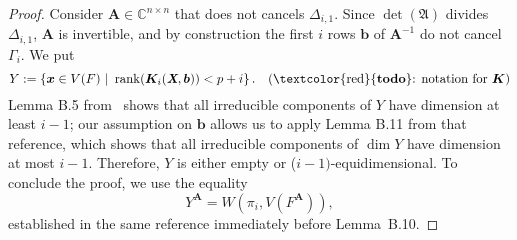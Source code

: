 \documentclass[12pt]{article}
\def\A{\mathfrak{A}}
\def\Xb{\textit{\textbf{X}}}
\def\mA{{\bm A}}
\def\xb{{\bm x}}
\def\D{\Delta}
\DeclareMathOperator{\jac}{jac}
\DeclareMathOperator{\rk}{rank}
\def\C{\mathbb{C}}
\def\bbm{\begin{bmatrix}}
\def\ebm{\end{bmatrix}}
\newcommand\todo[1]{(\textcolor{red}{{\bf todo}}: #1)}
\def\gi{\Gamma_i}
\begin{document}
\begin{proof}
  Consider $\bm A \in \C^{n \times n}$ that does not cancels
  $\D_{i,1}$.  Since $\det(\A)$ divides $\D_{i,1}$, $\bm A$ is
  invertible, and by construction the first $i$ rows $\bm b$ of $\bm
  A^{-1}$ do not cancel $\gi$. We put
  \[
  Y := \left\{\xb \in V(F)~|~\rk (\bm K_i(\Xb,\bm b)) < p+i\right\}. \quad \text{\todo{notation for $\bm K$}}
  \]
  Lemma B.5 from~\cite{TWT} shows that all irreducible components of
  $Y$ have dimension at least $i-1$; our assumption on $\bm b$ allows
  us to apply Lemma B.11 from that reference, which shows that all
  irreducible components of $\dim Y$ have dimension at most $i-1$.
  Therefore, $Y$ is either empty or ($i-1)$-equidimensional. To
  conclude the proof, we use the equality
  \[
  Y^{\mA} = W\left(\pi_i,V\left(F^{\mA}\right)\right),
  \]
  established in the same reference immediately before Lemma~B.10.
\end{proof}
\end{document}
